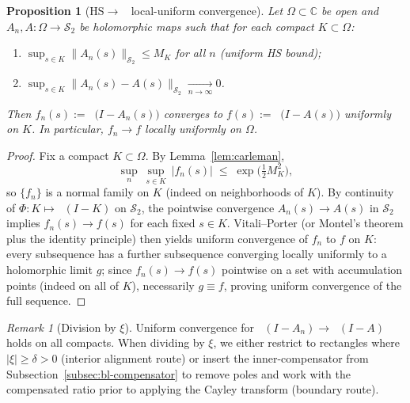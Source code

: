 \documentclass[11pt]{article}
\newtheorem{proposition}[theorem]{Proposition}
\theoremstyle{remark}
\newtheorem{remark}[theorem]{Remark}
\newcommand{\C}{\mathbb{C}}
\newcommand{\HS}{\mathcal{S}_2}
\DeclareMathOperator{\dettwo}{det_2}
\begin{document}
\begin{proposition}[HS\(\to\)\(\dettwo\) local-uniform convergence]\label{prop:HS-to-det2}
Let \(\Omega\subset\C\) be open and \(A_n,A:\Omega\to\HS\) be holomorphic maps such that for each compact \(K\subset\Omega\):
\begin{enumerate}
 \item \(\sup_{s\in K}\|A_n(s)\|_{\HS}\le M_K\) for all \(n\) (uniform HS bound);
 \item \(\sup_{s\in K}\|A_n(s)-A(s)\|_{\HS}\xrightarrow[n\to\infty]{}0\).
\end{enumerate}
Then \(f_n(s):=\dettwo\big(I-A_n(s)\big)\) converges to \(f(s):=\dettwo\big(I-A(s)\big)\) uniformly on \(K\). In particular, \(f_n\to f\) locally uniformly on \(\Omega\).
\end{proposition}
\begin{proof}
Fix a compact \(K\subset\Omega\). By Lemma~\ref{lem:carleman},
\[
 \sup_{n}\ \sup_{s\in K}\ |f_n(s)|\;\le\; \exp\!\Big(\tfrac12 M_K^2\Big),
\]
so \(\{f_n\}\) is a normal family on \(K\) (indeed on neighborhoods of \(K\)). By continuity of \(\Phi:K\mapsto\dettwo(I-K)\) on \(\HS\), the pointwise convergence \(A_n(s)\to A(s)\) in \(\HS\) implies \(f_n(s)\to f(s)\) for each fixed \(s\in K\). Vitali--Porter (or Montel's theorem plus the identity principle) then yields uniform convergence of \(f_n\) to \(f\) on \(K\): every subsequence has a further subsequence converging locally uniformly to a holomorphic limit \(g\); since \(f_n(s)\to f(s)\) pointwise on a set with accumulation points (indeed on all of \(K\)), necessarily \(g\equiv f\), proving uniform convergence of the full sequence.
\end{proof}

\begin{remark}[Division by \(\xi\)]
Uniform convergence for \(\dettwo(I-A_n)\to\dettwo(I-A)\) holds on all compacts. When dividing by \(\xi\), we either restrict to rectangles where \(|\xi|\ge \delta>0\) (interior alignment route) or insert the inner-compensator from Subsection~\ref{subsec:bl-compensator} to remove poles and work with the compensated ratio prior to applying the Cayley transform (boundary route).
\end{remark}
\end{document}

